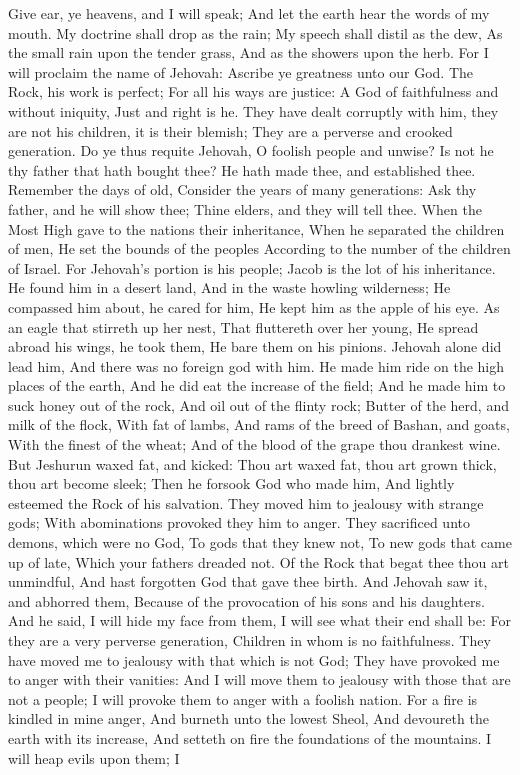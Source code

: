 Give ear, ye heavens, and I will speak; And let the earth hear the words of my mouth.  My doctrine shall drop as the rain; My speech shall distil as the dew, As the small rain upon the tender grass, And as the showers upon the herb.  For I will proclaim the name of Jehovah: Ascribe ye greatness unto our God.  The Rock, his work is perfect; For all his ways are justice: A God of faithfulness and without iniquity, Just and right is he.  They have dealt corruptly with him, they are not his children, it is their blemish; They are a perverse and crooked generation.  Do ye thus requite Jehovah, O foolish people and unwise? Is not he thy father that hath bought thee? He hath made thee, and established thee.  Remember the days of old, Consider the years of many generations: Ask thy father, and he will show thee; Thine elders, and they will tell thee.  When the Most High gave to the nations their inheritance, When he separated the children of men, He set the bounds of the peoples According to the number of the children of Israel.  For Jehovah’s portion is his people; Jacob is the lot of his inheritance.  He found him in a desert land, And in the waste howling wilderness; He compassed him about, he cared for him, He kept him as the apple of his eye.  As an eagle that stirreth up her nest, That fluttereth over her young, He spread abroad his wings, he took them, He bare them on his pinions.  Jehovah alone did lead him, And there was no foreign god with him.  He made him ride on the high places of the earth, And he did eat the increase of the field; And he made him to suck honey out of the rock, And oil out of the flinty rock;  Butter of the herd, and milk of the flock, With fat of lambs, And rams of the breed of Bashan, and goats, With the finest of the wheat; And of the blood of the grape thou drankest wine.  But Jeshurun waxed fat, and kicked: Thou art waxed fat, thou art grown thick, thou art become sleek; Then he forsook God who made him, And lightly esteemed the Rock of his salvation.  They moved him to jealousy with strange gods; With abominations provoked they him to anger.  They sacrificed unto demons, which were no God, To gods that they knew not, To new gods that came up of late, Which your fathers dreaded not.  Of the Rock that begat thee thou art unmindful, And hast forgotten God that gave thee birth.  And Jehovah saw it, and abhorred them, Because of the provocation of his sons and his daughters.  And he said, I will hide my face from them, I will see what their end shall be: For they are a very perverse generation, Children in whom is no faithfulness.  They have moved me to jealousy with that which is not God; They have provoked me to anger with their vanities: And I will move them to jealousy with those that are not a people; I will provoke them to anger with a foolish nation.  For a fire is kindled in mine anger, And burneth unto the lowest Sheol, And devoureth the earth with its increase, And setteth on fire the foundations of the mountains.  I will heap evils upon them; I 